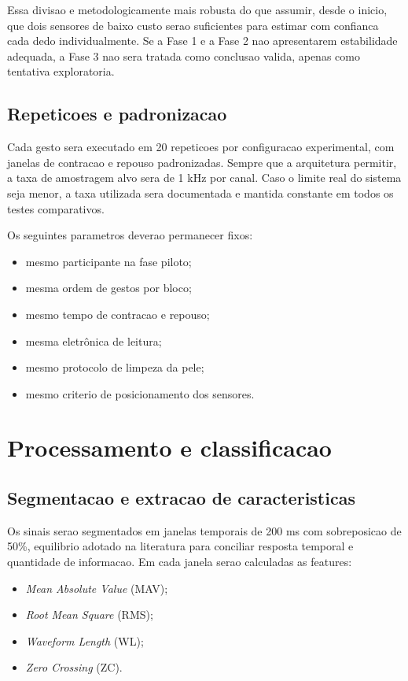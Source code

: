 \documentclass[12pt,oneside,a4paper,brazilian]{abntex2}
\begin{document}
Essa divisao e metodologicamente mais robusta do que assumir, desde o inicio, que dois sensores de baixo custo serao suficientes para estimar com confianca cada dedo individualmente. Se a Fase 1 e a Fase 2 nao apresentarem estabilidade adequada, a Fase 3 nao sera tratada como conclusao valida, apenas como tentativa exploratoria.

\subsection{Repeticoes e padronizacao}

Cada gesto sera executado em 20 repeticoes por configuracao experimental, com janelas de contracao e repouso padronizadas. Sempre que a arquitetura permitir, a taxa de amostragem alvo sera de 1 kHz por canal. Caso o limite real do sistema seja menor, a taxa utilizada sera documentada e mantida constante em todos os testes comparativos.

Os seguintes parametros deverao permanecer fixos:

\begin{itemize}
  \item mesmo participante na fase piloto;
  \item mesma ordem de gestos por bloco;
  \item mesmo tempo de contracao e repouso;
  \item mesma eletrônica de leitura;
  \item mesmo protocolo de limpeza da pele;
  \item mesmo criterio de posicionamento dos sensores.
\end{itemize}

\section{Processamento e classificacao}

\subsection{Segmentacao e extracao de caracteristicas}

Os sinais serao segmentados em janelas temporais de 200 ms com sobreposicao de 50\%, equilibrio adotado na literatura para conciliar resposta temporal e quantidade de informacao. Em cada janela serao calculadas as features:

\begin{itemize}
  \item \textit{Mean Absolute Value} (MAV);
  \item \textit{Root Mean Square} (RMS);
  \item \textit{Waveform Length} (WL);
  \item \textit{Zero Crossing} (ZC).
\end{itemize}
\end{document}
